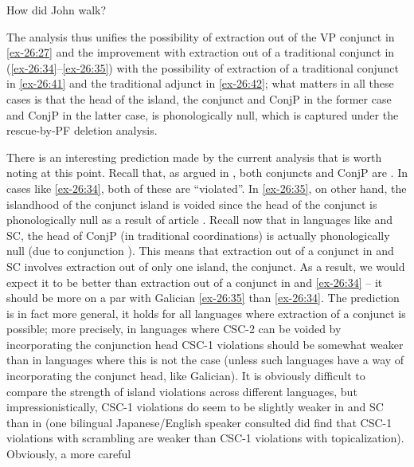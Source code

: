 \documentclass[output=paper]{langsci/langscibook}
\begin{document}
\ea\label{ex-26:42} How did John walk?
\z

The analysis thus unifies the possibility of extraction out of the VP conjunct
in \eqref{ex-26:27} and the improvement with extraction out of a traditional conjunct in
(\ref{ex-26:34}--\ref{ex-26:35}) with the possibility of extraction of a traditional conjunct in \eqref{ex-26:41}
and the traditional adjunct in \eqref{ex-26:42}; what matters in all these cases is that
the head of the island, the conjunct and ConjP in the former case and ConjP in
the latter case, is phonologically null, which is captured under the
rescue-by-\gls{PF} deletion analysis.

There is an interesting prediction made by the current analysis that is worth
noting at this point. Recall that, as argued in \textcite{Oda:2017}, both conjuncts
and ConjP are . In cases like  \eqref{ex-26:34}, both of these  are
“violated”. In \eqref{ex-26:35}, on other hand, the islandhood of the conjunct island is
voided since the head of the conjunct is phonologically null as a result of
article . Recall now that in languages like  and \gls{SC}, the
head of ConjP (in traditional coordinations) is actually phonologically null
(due to conjunction ). This means that extraction out of a
conjunct in  and \gls{SC} involves extraction out of only one island,
the conjunct. As a result, we would expect it to be better than extraction out
of a conjunct in  and  \eqref{ex-26:34} – it should be more on a par with
Galician \eqref{ex-26:35} than  \eqref{ex-26:34}. The prediction is in fact more general, it
holds for all languages where extraction of a conjunct is possible; more
precisely, in languages where CSC-2 can be voided by incorporating the
conjunction head CSC-1 violations should be somewhat weaker than in languages
where this is not the case (unless such languages have a way of incorporating
the conjunct head, like Galician). It is obviously difficult to compare the
strength of island violations across different languages, but
impressionistically, CSC-1 violations do seem to be slightly weaker in 
and \gls{SC} than in  (one bilingual Japanese/English speaker consulted
did find that CSC-1 violations with  scrambling are weaker than CSC-1
violations with  topicalization). Obviously, a more careful
\end{document}
